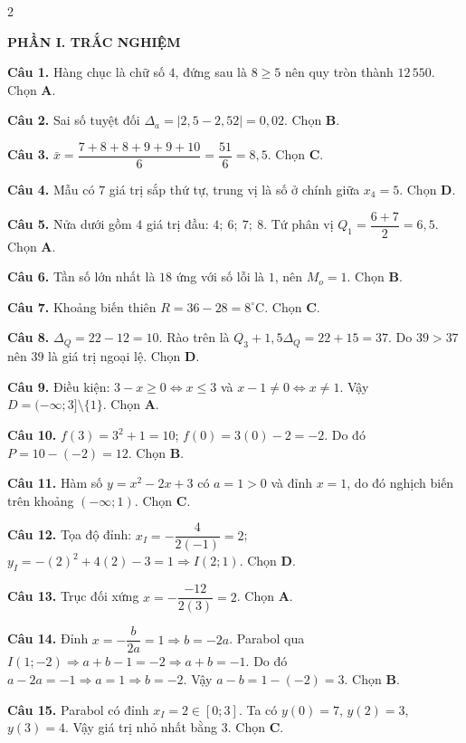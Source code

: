 \documentclass[10pt,a4paper]{article}
\begin{document}
\begin{multicols}{2}
\raggedcolumns
\small

\textbf{\color{accent}PHẦN I. TRẮC NGHIỆM}

\textbf{Câu 1.} Hàng chục là chữ số $4$, đứng sau là $8 \ge 5$ nên quy tròn thành $12\,550$. Chọn \textbf{A}.

\textbf{Câu 2.} Sai số tuyệt đối $\Delta_a = |2{,}5 - 2{,}52| = 0{,}02$. Chọn \textbf{B}.

\textbf{Câu 3.} $\bar{x} = \dfrac{7 + 8 + 8 + 9 + 9 + 10}{6} = \dfrac{51}{6} = 8{,}5$. Chọn \textbf{C}.

\textbf{Câu 4.} Mẫu có $7$ giá trị sắp thứ tự, trung vị là số ở chính giữa $x_4 = 5$. Chọn \textbf{D}.

\textbf{Câu 5.} Nửa dưới gồm $4$ giá trị đầu: $4;\ 6;\ 7;\ 8$. Tứ phân vị $Q_1 = \dfrac{6 + 7}{2} = 6{,}5$. Chọn \textbf{A}.

\textbf{Câu 6.} Tần số lớn nhất là $18$ ứng với số lỗi là $1$, nên $M_o = 1$. Chọn \textbf{B}.

\textbf{Câu 7.} Khoảng biến thiên $R = 36 - 28 = 8^\circ\text{C}$. Chọn \textbf{C}.

\textbf{Câu 8.} $\Delta_Q = 22 - 12 = 10$. Rào trên là $Q_3 + 1{,}5\Delta_Q = 22 + 15 = 37$. Do $39 > 37$ nên $39$ là giá trị ngoại lệ. Chọn \textbf{D}.

\textbf{Câu 9.} Điều kiện: $3 - x \ge 0 \Leftrightarrow x \le 3$ và $x - 1 \ne 0 \Leftrightarrow x \ne 1$. Vậy $D = (-\infty; 3] \setminus \{1\}$. Chọn \textbf{A}.

\textbf{Câu 10.} $f(3) = 3^2 + 1 = 10$; $f(0) = 3(0) - 2 = -2$. Do đó $P = 10 - (-2) = 12$. Chọn \textbf{B}.

\textbf{Câu 11.} Hàm số $y = x^2 - 2x + 3$ có $a = 1 > 0$ và đỉnh $x = 1$, do đó nghịch biến trên khoảng $(-\infty; 1)$. Chọn \textbf{C}.

\textbf{Câu 12.} Tọa độ đỉnh: $x_I = -\dfrac{4}{2(-1)} = 2$; $y_I = -(2)^2 + 4(2) - 3 = 1 \Rightarrow I(2; 1)$. Chọn \textbf{D}.

\textbf{Câu 13.} Trục đối xứng $x = -\dfrac{-12}{2(3)} = 2$. Chọn \textbf{A}.

\textbf{Câu 14.} Đỉnh $x = -\dfrac{b}{2a} = 1 \Rightarrow b = -2a$. Parabol qua $I(1; -2) \Rightarrow a + b - 1 = -2 \Rightarrow a + b = -1$. Do đó $a - 2a = -1 \Rightarrow a = 1 \Rightarrow b = -2$. Vậy $a - b = 1 - (-2) = 3$. Chọn \textbf{B}.

\textbf{Câu 15.} Parabol có đỉnh $x_I = 2 \in [0; 3]$. Ta có $y(0) = 7$, $y(2) = 3$, $y(3) = 4$. Vậy giá trị nhỏ nhất bằng $3$. Chọn \textbf{C}.


\end{multicols}
\end{document}
